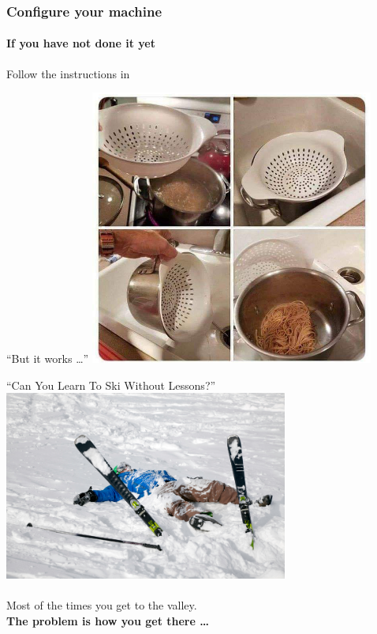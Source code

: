 \documentclass{beamer}%
\begin{document}
\begin{frame}
\frametitle{Configure your machine}
\framesubtitle{If you have not done it yet}
\centering
Follow the instructions in\\
 \myurl{\homepagesetup}
\end{frame}

\begin{frame}{``But it works \ldots''}
\centering 
\includegraphics[width=0.7\textwidth]{figures/itDoesTheJob.jpg}
\end{frame}

\begin{frame}{``Can You Learn To Ski Without Lessons?''}
	\centering 
	\includegraphics[width=0.7\textwidth]{figures/f737c96e-beginner-skier.jpg}
	\\
	{\scriptsize{}}
	\\
	\vspace{0.2cm}
	Most of the times you get to the valley. 
	\\
	\textbf{The problem is how you get there \ldots}
\end{frame}

\end{document}
